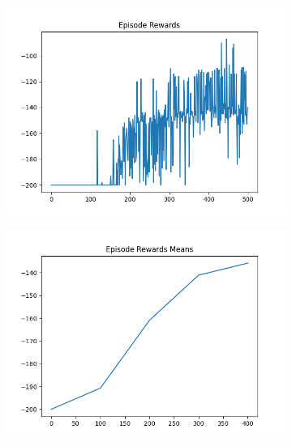 \begin{figure}[H]
\begin{subfigure}{.47\linewidth}
        \includegraphics[width=\textwidth]{mountain/2024-06-15_13-00-05_dqn_mountaincar_episode_rewards.png}
    \end{subfigure}
    \begin{subfigure}{.47\linewidth}
        \centering
        \includegraphics[width=\textwidth]{mountain/2024-06-15_13-00-05_dqn_mountaincar_episode_rewards_means.png}
    \end{subfigure}
\end{figure}
